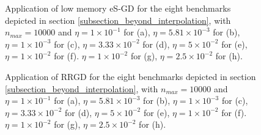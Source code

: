 \documentclass[article,authoryear,jmlmc]{beg_32}             %
\begin{document}
\begin{figure}[h!]
	\centering
	\scalebox{0.60}{}
        \caption{
          Application of low memory eS-GD for the eight benchmarks depicted in section \ref{subsection_beyond_interpolation}, with $n_{max}=10000$ and
 $\eta = 1   \times 10^{-1}$  for \exOne    (a),
 $\eta = 5.81\times 10^{-3}$  for \exTwo    (b),
 $\eta = 1   \times 10^{-3}$  for \exThree  (c),
 $\eta = 3.33\times 10^{-2}$  for \exFour   (d),
 $\eta = 5   \times 10^{-2}$  for \exFive   (e),
 $\eta = 1   \times 10^{-2}$  for \exSix    (f).
 $\eta = 1   \times 10^{-2}$  for \exSeven  (g),
 $\eta = 2.5 \times 10^{-2}$  for \exHeight (h).
}
	\label{SPETH_exs}
\end{figure}

\begin{figure}[h!]
	\centering
        \scalebox{0.60}{}
	\caption{
          Application of RRGD for the eight benchmarks depicted in section \ref{subsection_beyond_interpolation}, with $n_{max}=10000$ and 
 $\eta = 1   \times 10^{-1}$  for \exOne    (a), 
 $\eta = 5.81\times 10^{-3}$  for \exTwo    (b), 
 $\eta = 1   \times 10^{-3}$  for \exThree  (c), 
 $\eta = 3.33\times 10^{-2}$  for \exFour   (d), 
 $\eta = 5   \times 10^{-2}$  for \exFive   (e), 
 $\eta = 1   \times 10^{-2}$  for \exSix    (f). 
 $\eta = 1   \times 10^{-2}$  for \exSeven  (g), 
 $\eta = 2.5 \times 10^{-2}$  for \exHeight (h). 
        }
	\label{SGD_exs}
\end{figure}
\end{document}
